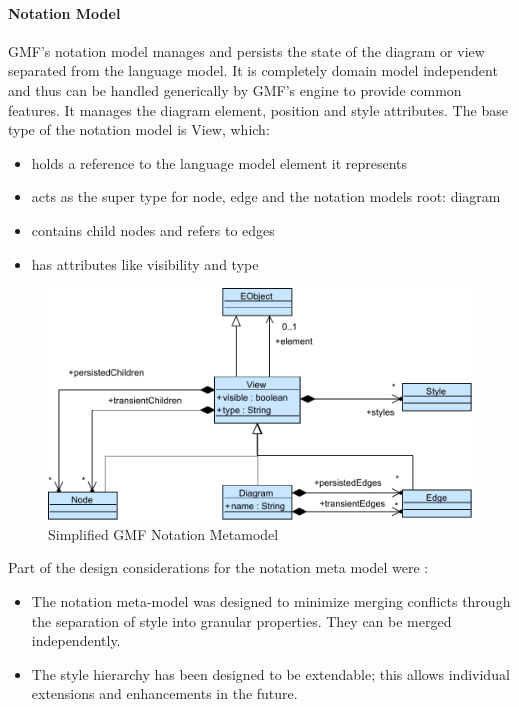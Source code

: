 \paragraph{Notation Model}
GMF's notation model manages and persists the state of the diagram or view separated from the language model. It is completely domain model independent and thus can be handled generically by GMF's engine to provide common features. It manages the diagram element, position and style attributes. \cite{EMP} The base type of the notation model is View, which:
\begin{itemize}
	\item holds a reference to the language model element it represents 
	\item acts as the super type for node, edge and the notation models root: diagram
	\item contains child nodes and refers to edges
	\item has attributes like visibility and type
\end{itemize}

\begin{figure}
\centering
\includegraphics[scale=0.8]{gfx/ex/GMF_Notation} 
\caption{Simplified GMF Notation Metamodel}
\label{MM:GMF}
\end{figure}

Part of the design considerations for the notation meta model  were \cite{GMFDoc}:
\begin{itemize}
	\item The notation meta-model was designed to minimize merging conflicts through the separation of style into granular properties. They can be merged independently.
	\item The style hierarchy has been designed to be extendable; this allows individual extensions and enhancements in the future. 
\end{itemize}

